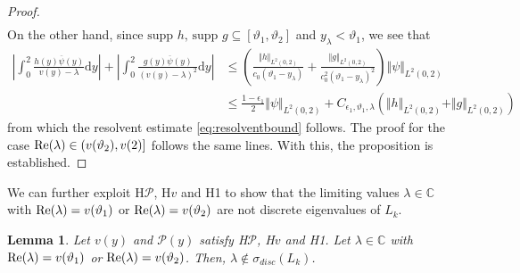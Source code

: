 \documentclass[11pt,reqno]{amsproc}
\newtheorem{lemma}[proposition]{Lemma}
\theoremstyle{definition}
\numberwithin{equation}{section}
\newcommand{\C}{{\mathbb C}}
\renewcommand{\d}{\mathrm{d}}
\renewcommand{\P}{{\mathcal{P}}}
\def\Re{{\rm Re}}
\begin{document}
\begin{proof}
\begin{align*}
\end{align*}
On the other hand, since $\text{supp }h,\, \text{supp }g \subseteq [\vartheta_1, \vartheta_2]$ and $y_\lambda < \vartheta_1$, we see that
\begin{align*}
\left| \int_0^2 \frac{h(y) \overline{\psi}(y)}{v(y) - \lambda} \d y \right| +  \left| \int_0^2 \frac{g(y) \overline{\psi}(y)}{(v(y) - \lambda)^2} \d y \right| &\leq \left( \frac{\Vert h \Vert_{L^2(0,2)}}{c_0(\vartheta_1-y_\lambda)} + \frac{\Vert g \Vert_{L^2(0,2)}}{c_0^2(\vartheta_1- y_\lambda)^2} \right) \Vert \psi \Vert_{L^2(0,2)} \\
&\leq \frac{1-\epsilon_1}{2}\Vert \psi \Vert_{L^2(0,2)} + C_{\epsilon_1, \vartheta_1, \lambda}\left( \Vert h \Vert_{L^2(0,2)} + \Vert g \Vert_{L^2(0,2)} \right)
\end{align*}
from which the resolvent estimate \eqref{eq:resolventbound} follows. The proof for the case $\Re(\lambda) \in (v(\vartheta_2), v(2)]$ follows the same lines. With this, the proposition is established.
\end{proof}

We can further exploit {H$\P$, H$v$} and H1 to show that the limiting values $\lambda\in\C$ with $\Re(\lambda) = v(\vartheta_1)$ or $\Re(\lambda) = v(\vartheta_2)$ are not discrete eigenvalues of $L_k$.

\begin{lemma}\label{lemma:boundarysuppnoteigen}
Let $v(y)$ and $\P(y)$ satisfy {H$\P$, H$v$} and H1. Let $\lambda\in \C$ with $\Re(\lambda) = v(\vartheta_1)$ or $\Re(\lambda) = v(\vartheta_2)$. Then,  $\lambda\not \in \sigma_{disc}(L_k)$.
\end{lemma}
\end{document}
